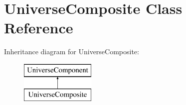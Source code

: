 \hypertarget{classUniverseComposite}{}\section{Universe\+Composite Class Reference}
\label{classUniverseComposite}
Inheritance diagram for Universe\+Composite\+:\begin{figure}[H]
\begin{center}
\leavevmode
\includegraphics[height=2.000000cm]{classUniverseComposite}
\end{center}
\end{figure}
